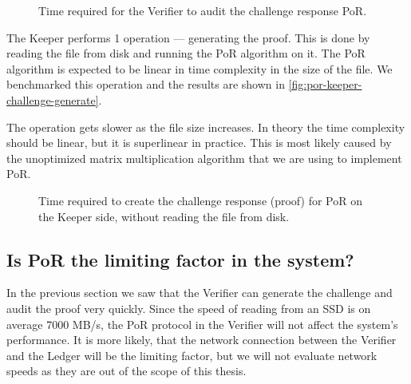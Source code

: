\begin{figure}
  \myfloatalign
  \caption[]{Time required for the Verifier to audit the challenge response PoR.}
  \label{fig:por-verifier-audit-challenge}
\end{figure}

The Keeper performs 1 operation --- generating the proof.
This is done by reading the file from disk and running the PoR algorithm on it.
The PoR algorithm is expected to be linear in time complexity in the size of the file.
We benchmarked this operation and the results are shown in \autoref{fig:por-keeper-challenge-generate}.

The operation gets slower as the file size increases.
In theory the time complexity should be linear, but it is superlinear in practice.
This is most likely caused by the unoptimized matrix multiplication algorithm that we are using to
implement PoR.

\begin{figure}
  \myfloatalign
  \caption[]{Time required to create the challenge response (proof) for PoR on the Keeper side, without reading the file from disk.}
  \label{fig:por-keeper-challenge-generate}
\end{figure}

\subsection{Is PoR the limiting factor in the system?}

In the previous section we saw that the Verifier can generate the challenge and audit the proof very quickly.
Since the speed of reading from an SSD is on average 7000 MB/s, the PoR protocol in the Verifier
will not affect the system's performance.
It is more likely, that the network connection between the Verifier and the Ledger will be the limiting factor,
but we will not evaluate network speeds as they are out of the scope of this thesis.

